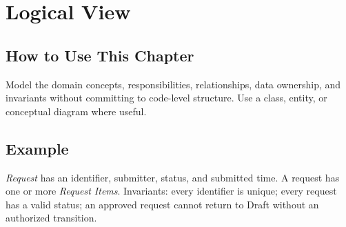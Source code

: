 \chapter{Logical View}
\section{How to Use This Chapter}
Model the domain concepts, responsibilities, relationships, data ownership, and invariants without committing to code-level structure. Use a class, entity, or conceptual diagram where useful.
\section{Example}
\textit{Request} has an identifier, submitter, status, and submitted time. A request has one or more \textit{Request Items}. Invariants: every identifier is unique; every request has a valid status; an approved request cannot return to Draft without an authorized transition.
